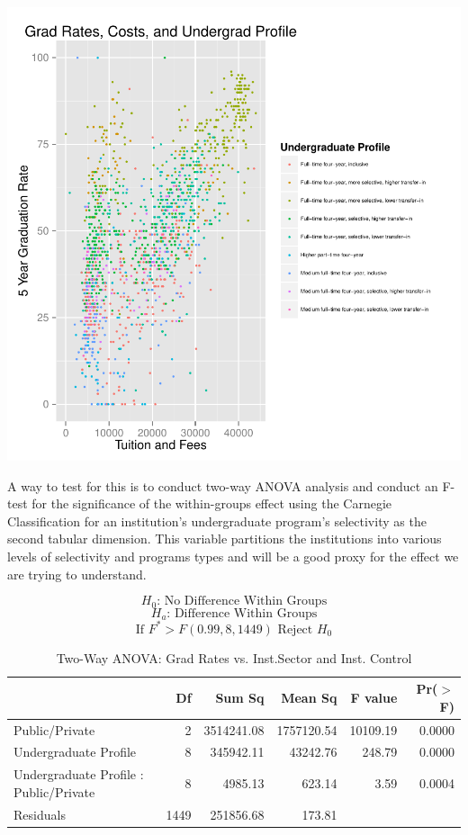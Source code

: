 \documentclass{article}
\begin{document}
\includegraphics{Fig-anovaplot}

\FloatBarrier

A way to test for this is to conduct two-way ANOVA analysis and conduct an F-test for the significance of the within-groups effect using the Carnegie Classification for an institution's undergraduate program's selectivity as the second tabular dimension. This variable partitions the institutions into various levels of selectivity and programs types and will be a good proxy for the effect we are trying to understand. 

$$ H_0\text{: No Difference Within Groups} $$
$$ H_a\text{: Difference Within Groups} $$
$$ \text{If }F^* > F(0.99,8,1449)\text{ Reject }H_0 $$

\begin{table}[ht]
\centering
\footnotesize
\begin{tabular}{lrrrrr}
  \hline
 & Df & Sum Sq & Mean Sq & F value & Pr($>$F) \\ 
  \hline
Public/Private & 2 & 3514241.08 & 1757120.54 & 10109.19 & 0.0000 \\ 
Undergraduate Profile & 8 & 345942.11 & 43242.76 & 248.79 & 0.0000 \\ 
Undergraduate Profile : Public/Private & 8 & 4985.13 & 623.14 & 3.59 & 0.0004 \\ 
  Residuals & 1449 & 251856.68 & 173.81 &  &  \\ 
   \hline
\end{tabular}
\caption{Two-Way ANOVA: Grad Rates vs. Inst.Sector and Inst. Control} 
\end{table}
\FloatBarrier
\end{document}
